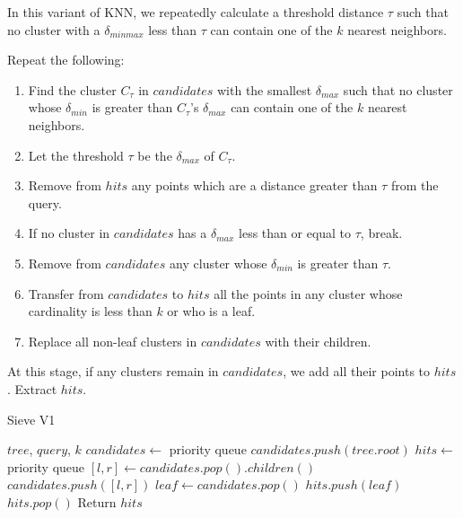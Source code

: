 In this variant of KNN, we repeatedly calculate a threshold distance $\tau$ such that no cluster with a $\delta_{minmax}$ less than $\tau$ 
can contain one of the $k$ nearest neighbors. 

Repeat the following: 
\begin{enumerate}
\item Find the cluster $C_{\tau}$ in $candidates$ with the smallest $\delta_{max}$ such that no cluster whose $\delta_{min}$ is greater than $C_{\tau}$'s $\delta_{max}$ can contain one of the $k$ nearest neighbors.
\item Let the threshold $\tau$ be the $\delta_{max}$ of $C_{\tau}$.
\item Remove from $hits$ any points which are a distance greater than $\tau$ from the query. 
\item If no cluster in $candidates$ has a $\delta_{max}$ less than or equal to $\tau$, break.
\item Remove from $candidates$ any cluster whose $\delta_{min}$ is greater than $\tau$.
\item Transfer from $candidates$ to $hits$ all the points in any cluster whose cardinality is less than $k$ or who is a leaf. 
\item Replace all non-leaf clusters in $candidates$ with their children. 
\end{enumerate}

At this stage, if any clusters remain in $candidates$, we add all their points to $hits$. 
Extract $hits$. 

\begin{algorithm} %
    \caption{Sieve V1} %
    \label{alg:sieve_v1} %
    \begin{algorithmic}[2] %
        \REQUIRE $tree$, $query$, $k$
        \STATE $candidates \leftarrow$ priority queue
        \STATE $candidates.push(tree.root)$
        \STATE $hits \leftarrow$ priority queue
                \STATE $[l, r] \leftarrow candidates.pop().children()$
                \STATE $candidates.push([l, r])$
            \ENDWHILE
            \STATE $leaf \leftarrow candidates.pop()$
            \STATE $hits.push(leaf)$
                \STATE $hits.pop()$
            \ENDWHILE
        \ENDWHILE
        \STATE Return $hits$
    \end{algorithmic}
    \end{algorithm}

